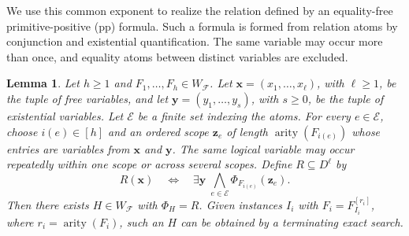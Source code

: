 \documentclass[11pt,letterpaper,onecolumn]{article}
\theoremstyle{plain}
\newtheorem{lemma}[lemma]{Lemma}
\theoremstyle{definition}
\theoremstyle{remark}
\newcommand{\cF}{\mathcal F}
\newcommand{\SuppRel}[1]{\Phi_{#1}}
\DeclareMathOperator{\arity}{arity}
\begin{document}
We use this common exponent to realize the relation defined by an
equality-free primitive-positive (pp) formula.  Such a formula is formed
from relation atoms by conjunction and existential quantification.
The same variable may occur more than once, and equality atoms between
distinct variables are excluded.

\begin{lemma}
\label{lem:equality-free-support-realization}
Let $h\ge1$ and $F_1,\ldots,F_h\in W_{\cF}$.  Let
$\mathbf x=(x_1,\ldots,x_\ell)$, with $\ell\ge1$, be the tuple of free
variables, and let $\mathbf y=(y_1,\ldots,y_s)$, with $s\ge0$, be the tuple
of existential variables.  Let $\mathcal E$ be a finite set indexing the
atoms.  For every $e\in\mathcal E$, choose
$i(e)\in[h]$ and an ordered scope $\mathbf z_e$ of length
$\arity(F_{i(e)})$ whose entries are variables from $\mathbf x$ and
$\mathbf y$.  The same logical variable may occur repeatedly within one
scope or across several scopes.  Define $R\subseteq D^\ell$ by
\begin{equation*}
  R(\mathbf x)
  \quad\Longleftrightarrow\quad
  \exists\mathbf y\;
  \bigwedge_{e\in\mathcal E}
       \SuppRel{F_{i(e)}}(\mathbf z_e).
\end{equation*}
Then there exists $H\in W_{\cF}$ with $\SuppRel H=R$.  Given instances
$I_i$ with $F_i=F_{I_i}^{[r_i]}$, where $r_i=\arity(F_i)$, such an $H$
can be obtained by a terminating exact search.
\end{lemma}
\end{document}
